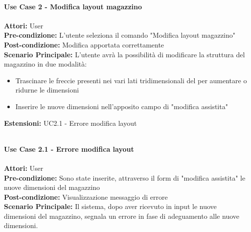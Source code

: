 \Large\textbf{}\\
\Large\textbf{Use Case 2 - Modifica layout magazzino} \\
\vspace{0.5cm}
\large\textbf{} \\
\textbf{Attori:} User\\
\textbf{Pre-condizione:} L'utente seleziona il comando "Modifica layout magazzino"\\
\textbf{Post-condizione: } Modifica apportata correttamente\\
\textbf{Scenario Principale:}  L'utente avrà la possibilità di modificare la struttura del magazzino in due modalità: 
\begin{itemize}
    \item Trascinare le freccie presenti nei vari lati tridimensionali del per aumentare o ridurne le dimensioni
    \item Inserire le nuove dimensioni nell'apposito campo di "modifica assistita"
\end{itemize}
\textbf{Estensioni: } UC2.1 - Errore modifica layout\\
\vspace{0.5cm}

\Large\textbf{}\\
\Large\textbf{Use Case 2.1 - Errore modifica layout} \\
\vspace{0.5cm}
\large\textbf{} \\
\textbf{Attori:} User\\
\textbf{Pre-condizione:} Sono state inserite, attraverso il form di "modifica assistita" le nuove dimensioni del magazzino \\
\textbf{Post-condizione: } Visualizzazione messaggio di errore\\
\textbf{Scenario Principale:}  Il sistema, dopo aver ricevuto in input le nuove dimensioni del magazzino, segnala un errore in fase di adeguamento alle nuove dimensioni.\\
\vspace{0.5cm}

